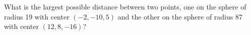 What is the largest possible distance between two points, one on the sphere of radius 19 with center $(-2, -10, 5)$ and the other on the sphere of radius 87 with center $(12, 8, -16)$?